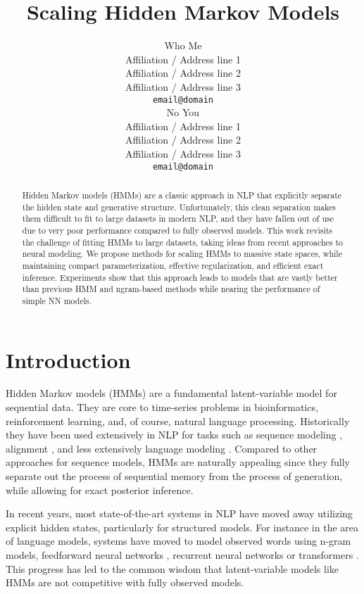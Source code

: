 \documentclass[11pt,a4paper]{article}
\title{Scaling Hidden Markov Models}
\author{Who Me \\
  Affiliation / Address line 1 \\
  Affiliation / Address line 2 \\
  Affiliation / Address line 3 \\
  \texttt{email@domain} \\\And
  No You \\
  Affiliation / Address line 1 \\
  Affiliation / Address line 2 \\
  Affiliation / Address line 3 \\
  \texttt{email@domain} \\}
\date{}
\begin{document}
\maketitle
\begin{abstract}
Hidden Markov models (HMMs) are a classic approach in NLP that 
explicitly separate the hidden state and generative structure.
Unfortunately, this clean separation makes them difficult to fit to large datasets in modern NLP, 
and they have fallen out of use due to very poor performance 
compared to fully observed models. This work revisits the challenge of 
fitting HMMs to large datasets, taking ideas from recent approaches to neural modeling.
We propose methods for scaling HMMs to massive state spaces, while maintaining compact parameterization, effective regularization, and efficient exact inference. Experiments show that this approach leads to models that are vastly better than previous HMM and ngram-based methods while nearing the performance of 
simple NN models. 
\end{abstract}

\section{Introduction}


Hidden Markov models (HMMs) are a fundamental latent-variable model for sequential data.
They are core to time-series problems in bioinformatics, reinforcement learning, and,
of course, natural language processing.
Historically they have been used extensively in NLP for tasks such as
sequence modeling \citep{rabiner1990tut}, alignment \citep{vogel1996hmm},
and less extensively language modeling \citep{kuhn1994hmmlm,huang2011thesis}. 
Compared to other approaches for sequence models, HMMs are naturally appealing since they 
fully separate out the process of sequential memory from the process of generation, while allowing for 
exact posterior inference. 



In recent years, most state-of-the-art systems in NLP have moved away utilizing explicit hidden states,
particularly for structured models. For instance in the area of language models, systems have moved to model observed words using n-gram models, feedforward neural networks \citep{bengio2003nlm}, recurrent neural networks \citep{mikolov2010rnn,zaremba2014lstm,merity2017awdlstm}
or transformers \citep{radford2019language}.
This progress has led to the common wisdom that latent-variable models like HMMs are not
competitive with fully observed models.
\end{document}
